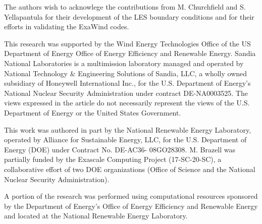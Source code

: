 \documentclass[conf]{new-aiaa}
\begin{document}
The authors wish to acknowlege the contributions from M. Churchfield
and S. Yellapantula for their development of the LES boundary
conditions and for their efforts in validating the ExaWind codes.

This research was supported by the Wind Energy Technologies Office of
the US Department of Energy Office of Energy Efficiency and Renewable
Energy.  Sandia National Laboratories is a multimission laboratory
managed and operated by National Technology \& Engineering Solutions
of Sandia, LLC, a wholly owned subsidiary of Honeywell International
Inc., for the U.S. Department of Energy's National Nuclear Security
Administration under contract DE-NA0003525. The views expressed in the
article do not necessarily represent the views of the U.S. Department
of Energy or the United States Government.

This work was authored in part by the National Renewable Energy
Laboratory, operated by Alliance for Sustainable Energy, LLC, for the
U.S. Department of Energy (DOE) under Contract No. DE-AC36-
08GO28308. M. Brazell was partially funded by the Exascale Computing
Project (17-SC-20-SC), a collaborative effort of two DOE organizations
(Office of Science and the National Nuclear Security Administration).

A portion of the research was performed using computational
resources sponsored by the Department of Energy's Office of Energy
Efficiency and Renewable Energy and located at the National Renewable
Energy Laboratory.


\end{document}

